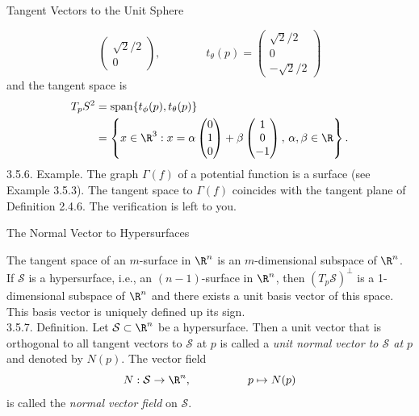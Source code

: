 \documentclass[smaller,hyperref={CJKbookmarks=true}]{beamer}
\begin{document}
\begin{frame}{Tangent Vectors to the Unit Sphere}
\begin{spacing}{1}
\[\begin{pmatrix}
              \sqrt{2}/2 \\
              0
            \end{pmatrix},\qquad\qquad
            t_\theta(p)=\begin{pmatrix}
                          \sqrt{2}/2 \\
                          0 \\
                          -\sqrt{2}/2
                        \end{pmatrix}\]
and the tangent space is
\begin{equation*}
  \begin{split}
     T_pS^2 &=\text{span}\{t_\phi(p),t_\theta(p)\} \\
       &=\left\{x\in\R^3:x=\alpha\begin{pmatrix}
                                   0 \\
                                   1 \\
                                   0
                                 \end{pmatrix}+\beta\begin{pmatrix}
                                                      1 \\
                                                      0 \\
                                                      -1
                                                    \end{pmatrix},\,\alpha,\beta\in\R\right\}.
  \end{split}
\end{equation*}
\alert{3.5.6. Example.} The graph $\Gamma(f)$ of a potential function is a surface (see Example 3.5.3). The tangent space to $\Gamma(f)$ coincides with the tangent plane of Definition 2.4.6. The verification is left to you.
\end{spacing}
\end{frame}
\begin{frame}[c]{The Normal Vector to Hypersurfaces}
\begin{spacing}{1.05}
The tangent space of an $m$-surface in $\R^n$ is an $m$-dimensional subspace of $\R^n$. If $\mathcal{S}$ is a hypersurface, i.e., an $(n-1)$-surface in $\R^n$, then $(T_p\mathcal{S})^\perp$ is a 1-dimensional subspace of $\R^n$ and there exists a unit basis vector of this space. This basis vector is uniquely defined up its sign.\\[5pt]
\alert{3.5.7. Definition.} Let $\mathcal{S}\subset\R^n$ be a hypersurface. Then a unit vector that is orthogonal to all tangent vectors to $\mathcal{S}$ at $p$ is called a \emph{unit normal vector to $\mathcal{S}$ at $p$} and denoted by $N(p)$. The vector field
\[N:\mathcal{S}\to\R^n,\qquad\qquad\quad
p\mapsto N(p)\]
is called the \emph{normal vector field} on $\mathcal{S}$.
\end{spacing}
\end{frame}
\end{document}
